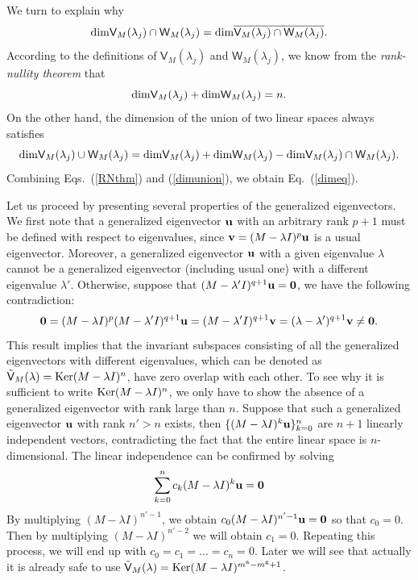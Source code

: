 \documentclass{tADP2e}
\theoremstyle{plain}
\theoremstyle{plain}
\theoremstyle{definition}
\begin{document}
\begin{appendices}
We turn to explain why 
\begin{equation}
{\rm dim}\textsf{V}_M(\lambda_j)\cap\textsf{W}_M(\lambda_j)={\rm dim}\overline{\textsf{V}_M(\lambda_j)\cap\textsf{W}_M(\lambda_j)}. 
\label{dimeq}
\end{equation}
According to the definitions of $\textsf{V}_M(\lambda_j)$ and $\textsf{W}_M(\lambda_j)$, we know from the \emph{rank-nullity theorem} that
\begin{equation}
{\rm dim}\textsf{V}_M(\lambda_j)+{\rm dim}\textsf{W}_M(\lambda_j)=n.
\label{RNthm}
\end{equation}
On the other hand, the dimension of the union of two linear spaces always satisfies
\begin{equation}
{\rm dim}\textsf{V}_M(\lambda_j)\cup \textsf{W}_M(\lambda_j)={\rm dim}\textsf{V}_M(\lambda_j)+{\rm dim}\textsf{W}_M(\lambda_j)-{\rm dim}\textsf{V}_M(\lambda_j)\cap \textsf{W}_M(\lambda_j).
\label{dimunion}
\end{equation} 
Combining Eqs.~(\ref{RNthm}) and (\ref{dimunion}), we obtain Eq.~(\ref{dimeq}).


Let us proceed by presenting several properties of the generalized eigenvectors. We first note that a generalized eigenvector $\bold{u}$ with an arbitrary rank $p+1$ must be defined with respect to eigenvalues, since $\bold{v}=(M - \lambda I)^p\bold{u}$ is a usual eigenvector. Moreover, a generalized eigenvector $\bold{u}$ with a given eigenvalue $\lambda$ cannot be a generalized eigenvector (including usual one) with a different eigenvalue $\lambda'$. Otherwise, suppose that $(M - \lambda' I)^{q+1}\bold{u}=\bold{0}$, we have the following contradiction:
\begin{equation}
\bold{0}=(M - \lambda I)^p(M - \lambda' I)^{q+1}\bold{u}=(M - \lambda' I)^{q+1}\bold{v}=(\lambda-\lambda')^{q+1}\bold{v}\neq\bold{0}.
\end{equation}
This result implies that the invariant subspaces consisting of all the generalized eigenvectors with different eigenvalues, which can be denoted as $\tilde{\textsf{V}}_M(\lambda)={\rm Ker}(M-\lambda I)^n$, have zero overlap with each other. 
To see why it is sufficient to write ${\rm Ker}(M-\lambda I)^n$, we only have to show the absence of a generalized eigenvector with rank large than $n$. Suppose that such a generalized eigenvector $\bold{u}$ with rank $n'>n$ exists, then $\{(M-\lambda I)^k\bold{u}\}^n_{k=0}$ are $n+1$ linearly independent vectors, contradicting the fact that the entire linear space is $n$-dimensional. The linear independence can be confirmed by solving 
\begin{equation}
\sum^n_{k=0} c_k(M-\lambda I)^k\bold{u}=\bold{0}
\end{equation}
By multiplying $(M-\lambda I)^{n'-1}$, we obtain $c_0(M-\lambda I)^{n'-1}\bold{u}=\bold{0}$ so that $c_0=0$. Then by multiplying $(M-\lambda I)^{n'-2}$ we will obtain $c_1=0$. Repeating this process, we will end up with $c_0=c_1=...=c_n=0$. 
Later we will see that actually it is already safe to use $\tilde{\textsf{V}}_M(\lambda)={\rm Ker}(M-\lambda I)^{m^{\rm a}-m^{\rm g}+1}$.


\end{appendices}
\end{document}
